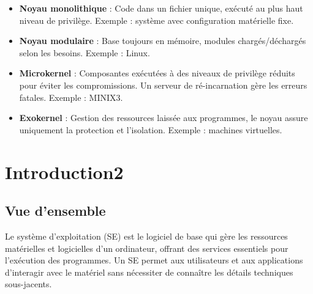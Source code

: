 \begin{itemize}
    \item \textbf{Noyau monolithique} : Code dans un fichier unique, exécuté au plus haut niveau de privilège. Exemple : système avec configuration matérielle fixe.
    \item \textbf{Noyau modulaire} : Base toujours en mémoire, modules chargés/déchargés selon les besoins. Exemple : Linux.
    \item \textbf{Microkernel} : Composantes exécutées à des niveaux de privilège réduits pour éviter les compromissions. 
    Un serveur de ré-incarnation gère les erreurs fatales. Exemple : MINIX3.
    \item \textbf{Exokernel} : Gestion des ressources laissée aux programmes, le noyau assure uniquement la protection et l'isolation. Exemple : machines virtuelles.
\end{itemize}









\section{Introduction2}\label{sec:introduction2}

\subsection{Vue d'ensemble}
Le système d'exploitation (SE) est le logiciel de base qui gère les ressources matérielles et logicielles d'un ordinateur, offrant des services essentiels pour l'exécution des programmes. 
Un SE permet aux utilisateurs et aux applications d'interagir avec le matériel sans nécessiter de connaître les détails techniques sous-jacents.

